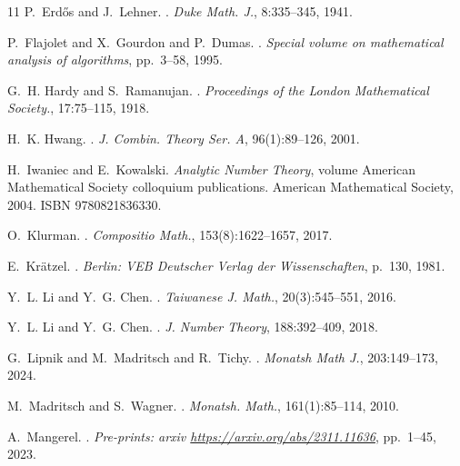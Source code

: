 \documentclass[12pt, oneside,reqno]{amsart}
\numberwithin{equation}{section}
\begin{document}
\begin{thebibliography}{11}
P.~Erd{\H{o}}s and J.~Lehner.
.
\newblock \textit{Duke Math. J.}, 8:335--345, 1941.

P.~Flajolet and X.~Gourdon and P.~Dumas.
.
\newblock \textit{Special volume on mathematical analysis of algorithms},
  pp.~3--58, 1995.

G.~H. Hardy and S.~Ramanujan.
.
\newblock \textit{Proceedings of the London Mathematical Society.}, 17:75--115,
  1918.

H.~K. Hwang.
.
\newblock \textit{J. Combin. Theory Ser. A}, 96(1):89--126, 2001.

H.~Iwaniec and E.~Kowalski.
\newblock \textit{{Analytic Number Theory}}, volume {American Mathematical
  Society colloquium publications}.
\newblock American Mathematical Society, 2004.
\newblock ISBN 9780821836330.

O.~Klurman.
.
\newblock \textit{Compositio Math.}, 153(8):1622--1657, 2017.

E.~Kr{\"{a}}tzel.
.
\newblock \textit{Berlin: VEB Deutscher Verlag der Wissenschaften}, p.~130, 1981.


Y.~L. Li and Y.~G. Chen.
.
\newblock \textit{Taiwanese J. Math.}, 20(3):545--551, 2016.

Y.~L. Li and Y.~G. Chen.
.
\newblock \textit{J. Number Theory}, 188:392--409, 2018.

G.~Lipnik and M.~Madritsch and R.~Tichy.
.
\newblock \textit{Monatsh Math J.}, 203:149--173, 2024.

M.~Madritsch and S.~Wagner.
.
\newblock \textit{Monatsh. Math.}, 161(1):85--114, 2010.

A.~Mangerel.
.
\newblock \textit{Pre-prints: arxiv {\url{https://arxiv.org/abs/2311.11636}}},
  pp.~1--45, 2023.


\end{thebibliography}
\end{document}
